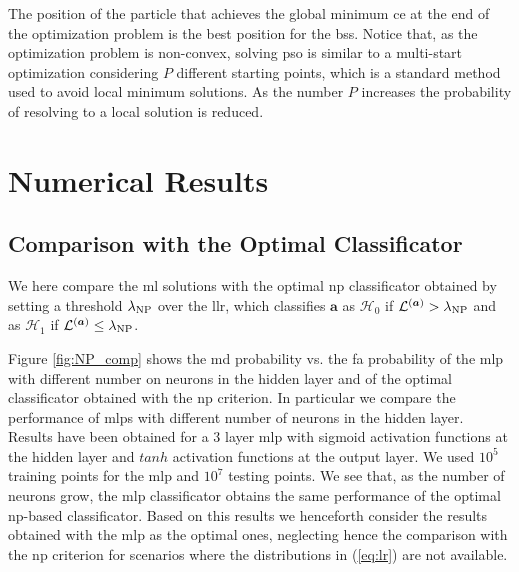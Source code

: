 \documentclass[twocolumns]{IEEEtran}
\begin{document}
The position of the particle that achieves the global minimum \ac{ce} at the end of the optimization problem is the best position for the \acp{bs}. Notice that, as the optimization problem is non-convex, solving \ac{pso} is similar to a multi-start optimization considering $P$ different starting points, which is a standard method used to avoid local minimum solutions. As the number $P$ increases the probability of resolving to a local solution is reduced.

\section{Numerical Results}
\subsection{Comparison with the Optimal Classificator}
We here compare the \ac{ml} solutions with the optimal \ac{np} classificator obtained by setting a threshold $\lambda_{\rm NP}$ over the \ac{llr}, which classifies $\bm{a}$ as $\mathcal{H}_0$ if $\mathcal{L}^{(\bm{a})} > \lambda_{\rm NP}$ and as $\mathcal{H}_1$ if $\mathcal{L}^{(\bm{a})} \le \lambda_{\rm NP}$.

Figure \ref{fig:NP_comp} shows the \ac{md} probability vs. the \ac{fa} probability of the \ac{mlp} with different number on neurons in the hidden layer and of the optimal classificator obtained with the  \ac{np} criterion. In particular we compare the performance of \acp{mlp} with different number of neurons in the hidden layer. Results have been obtained for a $3$ layer \ac{mlp} with sigmoid activation functions at the hidden layer and $tanh$ activation functions at the output layer. We used $10^5$ training points for the \ac{mlp} and $10^7$ testing points. We see that, as the number of neurons grow, the \ac{mlp} classificator obtains the same performance of the optimal \ac{np}-based classificator. Based on this results we henceforth consider the results obtained with the \ac{mlp} as the optimal ones, neglecting hence the comparison with the \ac{np} criterion for scenarios where the distributions in (\ref{eq:lr}) are not available.
\end{document}
